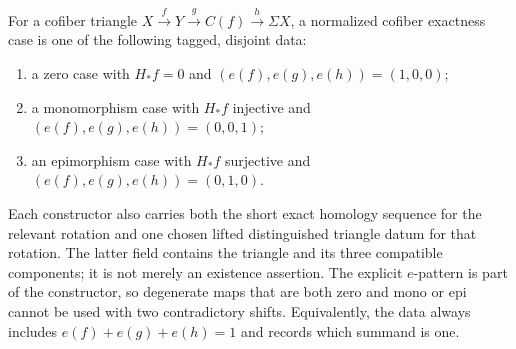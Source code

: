 \begin{definition}
  \label{def:normalized-synthetic-exactness-case}
  \notready
  For a cofiber triangle
  $X\xrightarrow fY\xrightarrow gC(f)\xrightarrow h\Sigma X$, a normalized
  cofiber exactness case is one of the following tagged, disjoint data:
  \begin{enumerate}
    \item a zero case with $H_*f=0$ and
      $(e(f),e(g),e(h))=(1,0,0)$;
    \item a monomorphism case with $H_*f$ injective and
      $(e(f),e(g),e(h))=(0,0,1)$;
    \item an epimorphism case with $H_*f$ surjective and
      $(e(f),e(g),e(h))=(0,1,0)$.
  \end{enumerate}
  Each constructor also carries both the short exact homology sequence for the
  relevant rotation and one chosen lifted distinguished triangle datum for
  that rotation.  The latter field contains the triangle and its
  three compatible components; it is not merely an existence assertion.  The explicit
  $e$-pattern is part of the constructor, so degenerate maps that are both zero
  and mono or epi cannot be used with two contradictory shifts.  Equivalently,
  the data always includes $e(f)+e(g)+e(h)=1$ and records which summand is one.
\end{definition}

